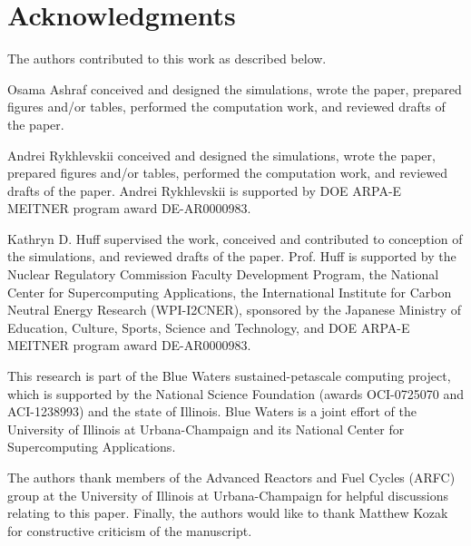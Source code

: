 \section{Acknowledgments}

The authors contributed to this work as described below.

Osama Ashraf conceived and designed the simulations, wrote the paper, prepared figures 
and/or tables, performed the computation work, and reviewed drafts of the paper.

Andrei Rykhlevskii conceived and designed the simulations, wrote the paper, prepared figures 
and/or tables, performed the computation work, and reviewed drafts of the paper. Andrei Rykhlevskii 
is supported by  DOE ARPA-E MEITNER program award DE-AR0000983. 

Kathryn D. Huff supervised the work, conceived and contributed to conception of the simulations, and reviewed drafts of the paper.  Prof. Huff is supported by the Nuclear Regulatory Commission Faculty Development Program, the National Center for Supercomputing Applications, the International Institute for Carbon Neutral Energy Research (WPI-I2CNER), 
sponsored by the Japanese Ministry of Education, Culture, Sports, Science and Technology, and  DOE ARPA-E MEITNER program award DE-AR0000983.

This research is part of the Blue Waters sustained-petascale computing 
project, which is supported by the National Science Foundation (awards 
OCI-0725070 and ACI-1238993) and the state of Illinois. Blue Waters is a joint 
effort of the University of Illinois at Urbana-Champaign and its National 
Center for Supercomputing Applications.

The authors thank members of the Advanced Reactors and Fuel Cycles (ARFC) 
group at the University of Illinois at Urbana-Champaign for helpful 
discussions relating to this paper. Finally, the authors would like to thank 
Matthew Kozak for constructive criticism of the manuscript.
